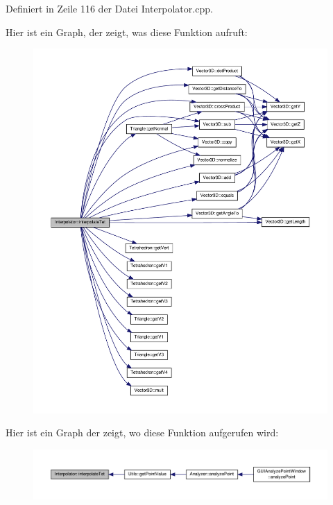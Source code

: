 Definiert in Zeile 116 der Datei Interpolator.\-cpp.



Hier ist ein Graph, der zeigt, was diese Funktion aufruft\-:\nopagebreak
\begin{figure}[H]
\begin{center}
\leavevmode
\includegraphics[width=350pt]{classInterpolator_a30e714ca6dff9b5745d029f95af1420a_cgraph}
\end{center}
\end{figure}




Hier ist ein Graph der zeigt, wo diese Funktion aufgerufen wird\-:
\nopagebreak
\begin{figure}[H]
\begin{center}
\leavevmode
\includegraphics[width=350pt]{classInterpolator_a30e714ca6dff9b5745d029f95af1420a_icgraph}
\end{center}
\end{figure}


